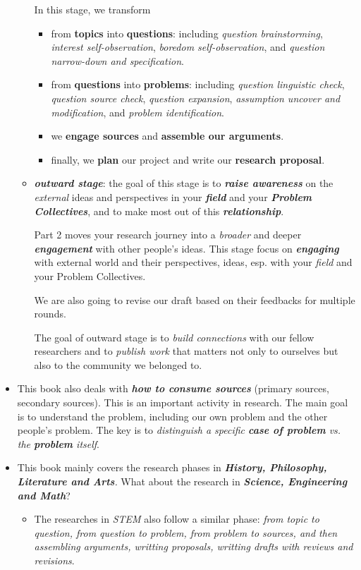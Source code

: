 \documentclass[11pt]{article}
\begin{document}
\begin{itemize}
\begin{itemize}
In this stage, we transform
\begin{itemize}
\item from \textbf{topics} into \textbf{questions}: including \emph{question brainstorming}, \emph{interest self-observation}, \emph{boredom self-observation}, and \emph{question narrow-down and specification}.

\item from \textbf{questions} into \textbf{problems}: including \emph{question linguistic check}, \emph{question source check}, \emph{question expansion}, \emph{assumption uncover and modification}, and \emph{problem identification}. 

\item we \textbf{engage sources} and \textbf{assemble our arguments}.
\item finally, we \textbf{plan} our project and write our \textbf{research proposal}.
\end{itemize}

\item \emph{\textbf{outward stage}}: the goal of this stage is to \emph{\textbf{raise awareness}} on the \emph{external} ideas and perspectives in your \emph{\textbf{field}} and your \emph{\textbf{Problem Collectives}}, and to make most out of this \emph{\textbf{relationship}}. 

Part 2 moves your research journey into a \emph{broader} and deeper \emph{\textbf{engagement}} with other people’s ideas.  This stage focus on \emph{\textbf{engaging}} with external world and their perspectives, ideas, esp. with your \emph{field} and your Problem Collectives. 

We are also going to revise our draft based on their feedbacks for multiple rounds. 

The goal of outward stage is to \emph{build connections} with our fellow researchers and to \emph{publish work} that matters not only to ourselves but also to the community we belonged to. 
\end{itemize}

\item This book also deals with \emph{\textbf{how to consume sources}} (primary sources, secondary sources). This is an important activity in research. The main goal is to understand the problem, including our own problem and the other people's problem.  The key is to \emph{distinguish a specific \textbf{case of problem} vs. the \textbf{problem} itself}.  

\item This book mainly covers the research phases in \emph{\textbf{History, Philosophy, Literature and Arts}.} What about the research in \emph{\textbf{Science, Engineering and Math}}?
\begin{itemize}
\item The researches in \emph{STEM} also follow a similar phase: \emph{from topic to question, from question to problem, from problem to sources, and then assembling arguments, writting proposals, writting drafts with reviews and revisions}. 


\end{itemize}
\end{itemize}
\end{document}
